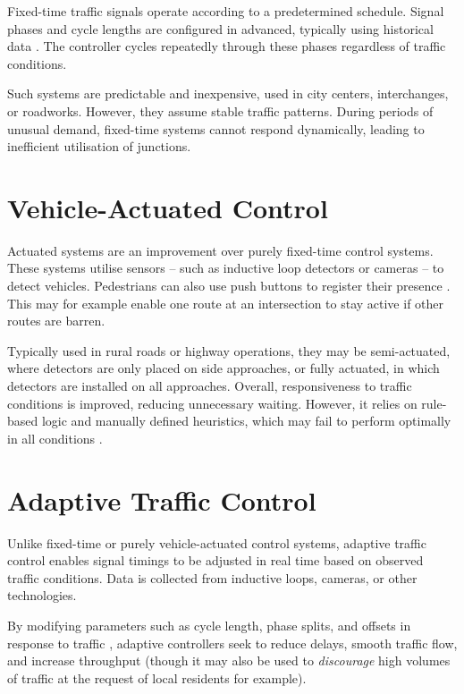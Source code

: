 \documentclass[a4paper]{report}
\begin{document}
Fixed-time traffic signals operate according to a predetermined schedule. Signal phases and cycle lengths are configured in advanced, typically using historical data \cite{GoelBusGershenson}. The controller cycles repeatedly through these phases regardless of traffic conditions.

Such systems are predictable and inexpensive, used in city centers, interchanges, or roadworks. However, they assume stable traffic patterns. During periods of unusual demand, fixed-time systems cannot respond dynamically, leading to inefficient utilisation of junctions.

\section{Vehicle-Actuated Control}

Actuated systems are an improvement over purely fixed-time control systems. These systems utilise sensors -- such as inductive loop detectors or cameras -- to detect vehicles. Pedestrians can also use push buttons to register their presence \cite{PedestrianCrossings23}. This may for example enable one route at an intersection to stay active if other routes are barren.

Typically used in rural roads or highway operations, they may be semi-actuated, where detectors are only placed on side approaches, or fully actuated, in which detectors are installed on all approaches. Overall, responsiveness to traffic conditions is improved, reducing unnecessary waiting. However, it relies on rule-based logic and manually defined heuristics, which may fail to perform optimally in all conditions \cite{LiPengHouEtAl2023}.

\section{Adaptive Traffic Control}

Unlike fixed-time or purely vehicle-actuated control systems, adaptive traffic control enables signal timings to be adjusted in real time based on observed traffic conditions. Data is collected from inductive loops, cameras, or other technologies.

By modifying parameters such as cycle length, phase splits, and offsets in response to traffic \cite{LiPengHouEtAl2023}, adaptive controllers seek to reduce delays, smooth traffic flow, and increase throughput (though it may also be used to \emph{discourage} high volumes of traffic at the request of local residents for example).
\end{document}
